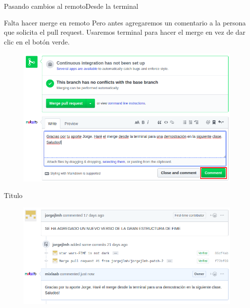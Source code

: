 \documentclass[10pt]{beamer}
\begin{document}
\begin{frame}{Pasando cambios al remoto}{Desde la terminal}

  \begin{block}{Falta hacer merge en remoto}
  Pero antes agregaremos un comentario a la persona que solicita el pull request. Usaremos terminal para hacer el merge en vez de dar clic en el botón verde.
  \begin{figure}[h!]
  \centering
  \includegraphics [scale=0.28]{step12}
  \label{fig:step12}
  \end{figure}
      
  \end{block}
  
\end{frame}

\begin{frame}{Titulo}{}

  \begin{block}{}
  
  \begin{figure}[h!]
  \centering
  \includegraphics [scale=0.28]{step13}
  \label{fig:step13}
  \end{figure}
      
  \end{block}
  
\end{frame}
\end{document}
